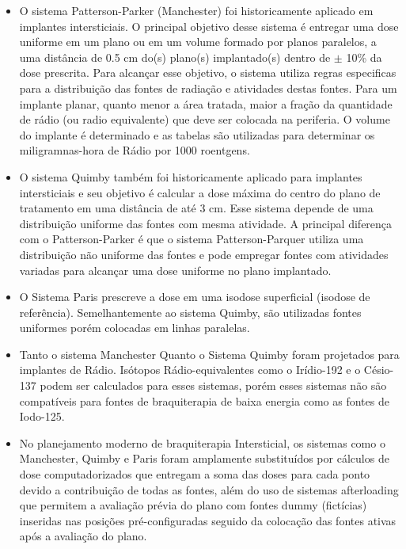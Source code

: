 \documentclass[11pt,a4paper]{article}
\newcounter{exemplo}
\begin{document}
\begin{exemplo}[8. Braquiterapia]
\begin{itemize}
        \item O sistema Patterson-Parker (Manchester) foi historicamente aplicado em implantes intersticiais. O principal objetivo desse sistema é entregar uma dose uniforme em um plano ou em um volume formado por planos paralelos, a uma distância de 0.5 cm do(s) plano(s) implantado(s) dentro de $\pm$ 10\% da dose prescrita. Para alcançar esse objetivo, o sistema utiliza regras especificas para a distribuição das fontes de radiação e atividades destas fontes. Para um implante planar, quanto menor a área tratada, maior a fração da quantidade de rádio (ou radio equivalente) que deve ser colocada na periferia. O volume do implante é determinado e as tabelas são utilizadas para determinar os miligramnas-hora de Rádio por 1000 roentgens. 
        
        \item O sistema Quimby também foi historicamente aplicado para implantes intersticiais e seu objetivo é calcular a dose máxima do centro do plano de tratamento em uma distância de até 3 cm. Esse sistema depende de uma distribuição uniforme das fontes com mesma atividade. A principal diferença com o Patterson-Parker é que o sistema Patterson-Parquer utiliza uma distribuição não uniforme das fontes e pode empregar fontes com atividades variadas para alcançar uma dose uniforme no plano implantado.
        
        \item O Sistema Paris prescreve a dose em uma isodose superficial (isodose de referência). Semelhantemente ao sistema Quimby, são utilizadas fontes uniformes porém colocadas em linhas paralelas.
        
        \item Tanto o sistema Manchester Quanto o Sistema Quimby foram projetados para implantes de Rádio. Isótopos Rádio-equivalentes como o Irídio-192 e o Césio-137 podem ser calculados para esses sistemas, porém esses sistemas não são compatíveis para fontes de braquiterapia de baixa energia como as fontes de Iodo-125.
        
        \item No planejamento moderno de braquiterapia Intersticial, os sistemas como o  Manchester, Quimby e Paris foram amplamente substituídos por cálculos de dose computadorizados que entregam a soma das doses para cada ponto devido a contribuição de todas as fontes, além do uso de sistemas afterloading que permitem a avaliação prévia do plano com fontes dummy (fictícias) inseridas nas posições pré-configuradas seguido da colocação das fontes ativas após a avaliação do plano. 


\end{itemize}
\end{exemplo}
\end{document}
